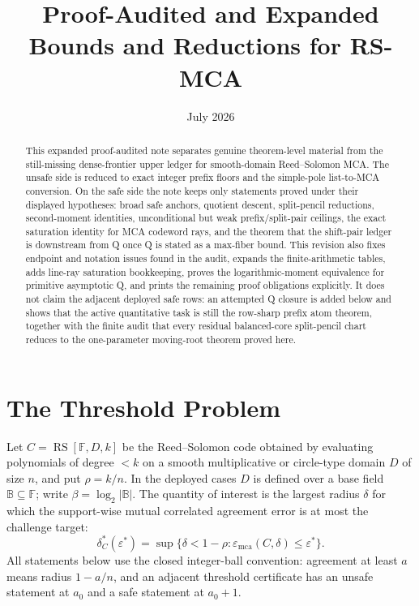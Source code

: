 \documentclass[a4paper,11pt]{amsart}
\title{Proof-Audited and Expanded Bounds and Reductions for RS-MCA}
\date{July 2026}
\theoremstyle{remark}
\newcommand{\F}{\mathbb F}
\newcommand{\B}{\mathbb B}
\newcommand{\RS}{\operatorname{RS}}
\newcommand{\emca}{\varepsilon_{\mathrm{mca}}}
\begin{document}
\begin{abstract}
This expanded proof-audited note separates genuine theorem-level material from the still-missing dense-frontier upper ledger for smooth-domain Reed--Solomon MCA.  The unsafe side is reduced to exact integer prefix floors and the simple-pole list-to-MCA conversion.  On the safe side the note keeps only statements proved under their displayed hypotheses: broad safe anchors, quotient descent, split-pencil reductions, second-moment identities, unconditional but weak prefix/split-pair ceilings, the exact saturation identity for MCA codeword rays, and the theorem that the shift-pair ledger is downstream from Q once Q is stated as a max-fiber bound.  This revision also fixes endpoint and notation issues found in the audit, expands the finite-arithmetic tables, adds line-ray saturation bookkeeping, proves the logarithmic-moment equivalence for primitive asymptotic Q, and prints the remaining proof obligations explicitly.  It does not claim the adjacent deployed safe rows: an attempted Q closure is added below and shows that the active quantitative task is still the row-sharp prefix atom theorem, together with the finite audit that every residual balanced-core split-pencil chart reduces to the one-parameter moving-root theorem proved here.
\end{abstract}

\maketitle




\section{The Threshold Problem}

Let \(C=\RS[\F,D,k]\) be the Reed--Solomon code obtained by evaluating polynomials of degree \(<k\) on a smooth multiplicative or circle-type domain \(D\) of size \(n\), and put \(\rho=k/n\).  In the deployed cases \(D\) is defined over a base field \(\B\subseteq\F\); write \(\beta=\log_2|\B|\).  The quantity of interest is the largest radius \(\delta\) for which the support-wise mutual correlated agreement error is at most the challenge target:
\[
        \delta_C^*(\varepsilon^*)=\sup\{\delta<1-\rho:\emca(C,\delta)\le\varepsilon^*\}.
\]
All statements below use the closed integer-ball convention: agreement at least \(a\) means radius \(1-a/n\), and an adjacent threshold certificate has an unsafe statement at \(a_0\) and a safe statement at \(a_0+1\).
\end{document}
